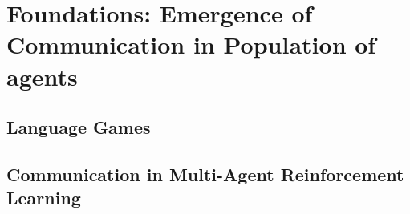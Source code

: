 \chapter{Foundations: Emergence of Communication in Population of agents}

\section{Language Games}

\section{Communication in Multi-Agent Reinforcement Learning}